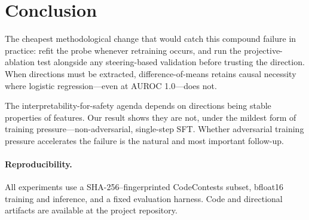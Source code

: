 \documentclass[11pt]{article}
\begin{document}
\section{Conclusion}

The cheapest methodological change that would catch this compound
failure in practice: refit the probe whenever retraining occurs, and
run the projective-ablation test alongside any steering-based
validation before trusting the direction. When directions must be
extracted, difference-of-means retains causal necessity where
logistic regression---even at AUROC 1.0---does not.

The interpretability-for-safety agenda depends on directions being
stable properties of features. Our result shows they are not, under
the mildest form of training pressure---non-adversarial, single-step
SFT. Whether adversarial training pressure accelerates the failure is
the natural and most important follow-up.

\vspace{1em}
\paragraph{Reproducibility.} All experiments use a
SHA-256--fingerprinted CodeContests subset, bfloat16 training and
inference, and a fixed evaluation harness. Code and directional
artifacts are available at the project repository.



\end{document}

